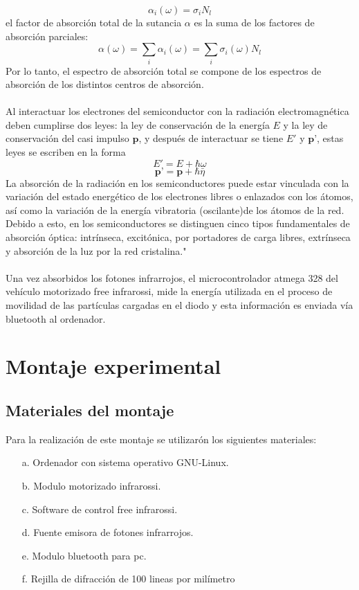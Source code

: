\documentclass[12]{article}
\begin{document}
\begin{multicols}{2}
\begin{equation}
\alpha_{i}(\omega) = \sigma_{i} N_{l}
\end{equation}
el factor de absorción total de la sutancia $\alpha$ es la suma de los factores de absorción parciales:
\begin{equation}
\alpha(\omega) = \sum_{i} \alpha_{i}(\omega) = \sum_{i} \sigma_{i}(\omega)N_{l}
\end{equation}
Por lo tanto, el espectro de absorción total se compone de los espectros de absorción de los distintos centros de absorción. \\\\
Al interactuar los electrones del semiconductor con la radiación electromagnética deben cumplirse dos leyes: la ley de conservación de la energía  $E$ y la ley de conservación del casi impulso $\textbf{p}$, y después de interactuar se tiene $E'$ y $\textbf{p'}$, estas leyes se escriben en la forma 
\begin{equation}
E' = E + \hbar \omega
\end{equation}
\begin{equation}
\textbf{p'} = \textbf{p} + \hbar \bar{\eta}
\end{equation}
La absorción de la radiación en los semiconductores puede estar vinculada con la variación del estado energético de los electrones libres o enlazados con los átomos, así como la variación de la energía vibratoria (oscilante)de los átomos de la red. Debido a esto, en los semiconductores se distinguen cinco tipos fundamentales  de absorción óptica: intrínseca, excitónica, por portadores de carga libres, extrínseca y absorción de la luz por la red cristalina."\cite{ESTADO_SOLIDO} \\\\
Una vez absorbidos los fotones infrarrojos, el microcontrolador atmega 328 del vehículo motorizado free infrarossi, mide la energía utilizada en el proceso de movilidad de las partículas cargadas en el diodo y esta información es enviada vía bluetooth al ordenador.
\section{Montaje experimental}
\subsection{Materiales del montaje}
Para la realización de este montaje se utilizarón los siguientes materiales:
\begin{enumerate}
\item[a.] Ordenador con sistema operativo GNU-Linux.
\item[b.] Modulo motorizado infrarossi.
\item[c.] Software de control free infrarossi.
\item[d.] Fuente emisora de fotones infrarrojos.
\item[e.] Modulo bluetooth para pc.
\item[f.] Rejilla de difracción de 100 lineas por milímetro 
\end{enumerate}

\end{multicols}
\end{document}
